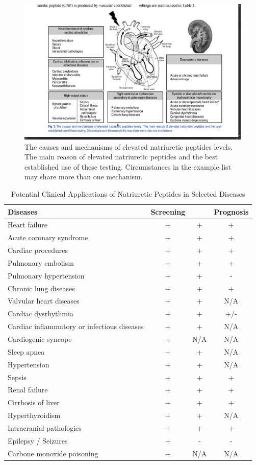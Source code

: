 \documentclass[14pt,a4paper,onecolumn]{article}
\begin{document}
\begin{figure}
    \includegraphics{./images/NP_causes.png}
    \caption{The causes and mechanisms of elevated natriuretic peptides levels. The main reason of elevated natriuretic peptides and the best established use of these testing. Circumstances in the example list may share more than one mechanism.}
    \label{NP_causes}
\end{figure}

\begin{table}
    \begin{tabular}{|l|c|c|c|}
        \hline
        Diseases & Screening &  & Prognosis \\
        \hline
        Heart failure & + & + & + \\
        Acute coronary syndrome & + & + & + \\
        Cardiac procedures & + & + & + \\
        Pulmonary embolism & + & + & + \\
        Pulmonary hypertension & + & + & - \\
        Chronic lung diseases & + & + & + \\
        Valvular heart diseases & + & + & N/A \\
        Cardiac dysrhythmia & + & + & +/- \\
        Cardiac inflammatory or infectious diseases & + & + & N/A \\
        Cardiogenic syncope & + & N/A & N/A \\
        Sleep apnea & + & + & N/A \\
        Hypertension & + & + & N/A \\
        Sepsis & + & + & + \\
        Renal failure & + & + & + \\
        Cirrhosis of liver & + & + & + \\
        Hyperthyroidism & + & + & N/A \\
        Intracranial pathologies & + & + & + \\
        Epilepsy / Seizures & + & - & - \\
        Carbone monoxide poisoning & + & N/A & N/A \\
        \hline
    \end{tabular}
    \caption{Potential Clinical Applications of Natriuretic Peptides in Selected Diseases}
    \label{NP_applications}
\end{table}
\end{document}
